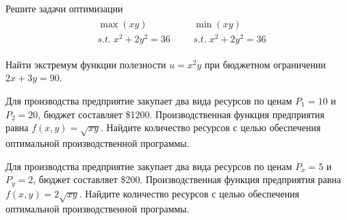 \begin{exercise}
Решите задачи оптимизации
\begin{align*}
	& \begin{gathered}
		\max(xy) \\ s.t.\;x^2+2y^2=36
	\end{gathered} &
	& \begin{gathered}
		\min(xy) \\ s.t.\;x^2+2y^2=36
	\end{gathered}
\end{align*}
\end{exercise}

\begin{exercise}
Найти экстремум функции полезности $u=x^2y$ при бюджетном ограничении
$2x+3y=90$. 
\end{exercise}

\begin{exercise}
Для производства предприятие закупает два вида ресурсов по ценам
$P_1=10$ и $P_2=20$, бюджет составляет \$1200. Производственная
функция предприятия равна $f(x,y)=\sqrt{xy}$. 
Найдите количество ресурсов с целью обеспечения оптимальной производственной программы.
\end{exercise}

\begin{exercise}
Для производства предприятие закупает два вида ресурсов по ценам
$P_x=5$ и $P_y=2$, бюджет составляет \$200. Производственная
функция предприятия равна $f(x,y)=2\sqrt{xy}$.
Найдите количество ресурсов с целью обеспечения оптимальной производственной программы.
\end{exercise}

